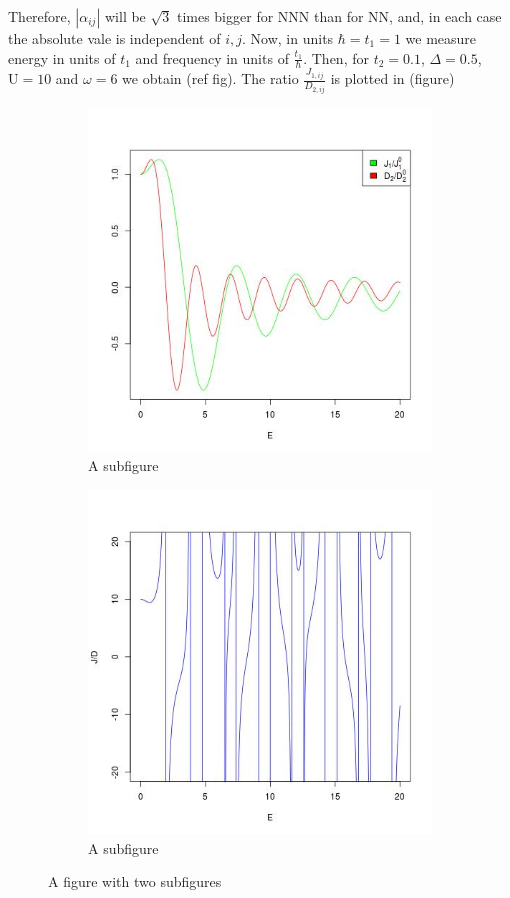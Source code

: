 Therefore, $|\alpha_{ij}|$ will be $\sqrt{3}$ times bigger for NNN than for NN, and, in each case the absolute vale is independent of $i,j$.  Now, in units $\hbar=t_1=1$ we measure energy in units of $t_1$ and frequency in units of $\frac{t_1}{\hbar}$. Then, for $t_2 = 0.1$, $\Delta = 0.5$, $\text{U} = 10$ and $\omega = 6$ we obtain (ref fig). The ratio $\frac{J_{1,ij}}{D_{2,ij}}$ is plotted in (figure)

\begin{figure}
\centering
\begin{subfigure}{.5\textwidth}
  \centering
  \includegraphics[width=.4\linewidth]{Chapters/NNvsNNN.jpg}
  \caption{A subfigure}
  \label{fig:sub1}
\end{subfigure}%
\begin{subfigure}{.5\textwidth}
  \centering
  \includegraphics[width=.4\linewidth]{Chapters/ratio.jpg}
  \caption{A subfigure}
  \label{fig:sub2}
\end{subfigure}
\caption{A figure with two subfigures}
\label{fig:test}
\end{figure}




